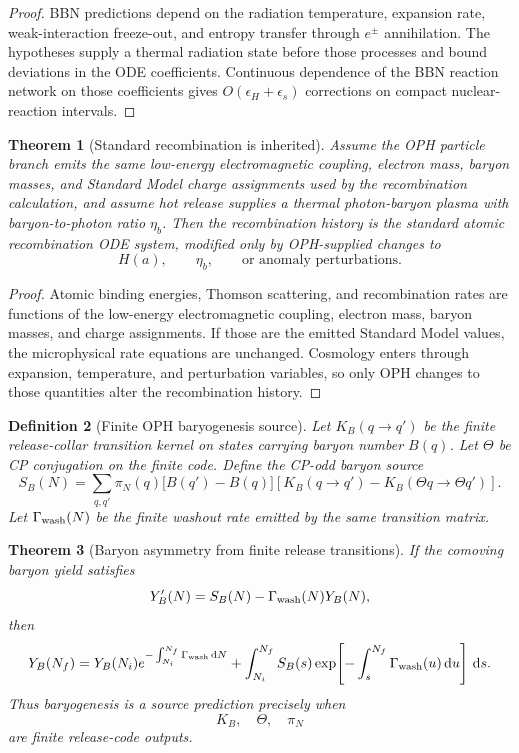 \documentclass[11pt]{article}
\newtheorem{theorem}{Theorem}[section]
\newtheorem{definition}[theorem]{Definition}
\newcommand{\dd}{\,\mathrm d}
\begin{document}
\begin{proof}
BBN predictions depend on the radiation temperature, expansion rate, weak-interaction freeze-out,
and entropy transfer through \(e^\pm\) annihilation. The hypotheses supply a thermal radiation state
before those processes and bound deviations in the ODE coefficients. Continuous dependence of the
BBN reaction network on those coefficients gives \(O(\epsilon_H+\epsilon_s)\) corrections on compact
nuclear-reaction intervals.
\end{proof}

\begin{theorem}[Standard recombination is inherited]\label{thm:standard-recombination}
Assume the OPH particle branch emits the same low-energy electromagnetic coupling, electron mass,
baryon masses, and Standard Model charge assignments used by the recombination calculation, and
assume hot release supplies a thermal photon-baryon plasma with baryon-to-photon ratio \(\eta_b\).
Then the recombination history is the standard atomic recombination ODE system, modified only by
OPH-supplied changes to
\[
H(a),
\qquad
\eta_b,
\qquad
\text{or anomaly perturbations}.
\]
\end{theorem}

\begin{proof}
Atomic binding energies, Thomson scattering, and recombination rates are functions of the
low-energy electromagnetic coupling, electron mass, baryon masses, and charge assignments. If those
are the emitted Standard Model values, the microphysical rate equations are unchanged. Cosmology
enters through expansion, temperature, and perturbation variables, so only OPH changes to those
quantities alter the recombination history.
\end{proof}

\begin{definition}[Finite OPH baryogenesis source]\label{def:finite-baryogenesis-source}
Let \(K_B(q\to q')\) be the finite release-collar transition kernel on states carrying baryon
number \(B(q)\). Let \(\Theta\) be CP conjugation on the finite code. Define the CP-odd baryon
source
\[
S_B(N)
=
\sum_{q,q'}
\pi_N(q)
\bigl[B(q')-B(q)\bigr]
\left[
K_B(q\to q')
-
K_B(\Theta q\to\Theta q')
\right].
\]
Let \(\Gamma_{\rm wash}(N)\) be the finite washout rate emitted by the same transition matrix.
\end{definition}

\begin{theorem}[Baryon asymmetry from finite release transitions]\label{thm:baryogenesis-gate}
If the comoving baryon yield satisfies
\[
Y_B'(N)
=
S_B(N)-\Gamma_{\rm wash}(N)Y_B(N),
\]
then
\[
Y_B(N_f)
=
Y_B(N_i)e^{-\int_{N_i}^{N_f}\Gamma_{\rm wash}\dd N}
+
\int_{N_i}^{N_f}
S_B(s)
\exp\!\left[
-\int_s^{N_f}\Gamma_{\rm wash}(u)\dd u
\right]\dd s.
\]
Thus baryogenesis is a source prediction precisely when
\[
K_B,\quad \Theta,\quad \pi_N
\]
are finite release-code outputs.
\end{theorem}
\end{document}
